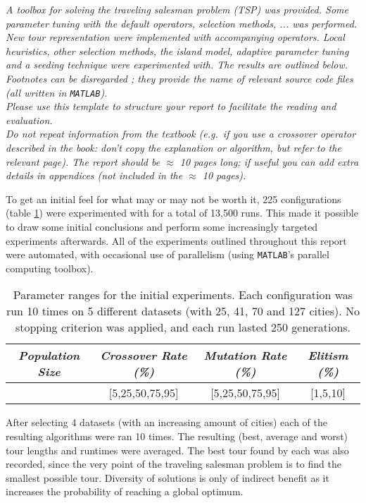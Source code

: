 
\begin{center}
\textit{A toolbox for solving the traveling salesman problem (TSP) was provided. Some parameter tuning with the default operators, selection methods, ... was performed. New tour representation were implemented with accompanying operators. Local heuristics, other selection methods, the island model, adaptive parameter tuning and a seeding technique were experimented with. The results are outlined below. Footnotes can be disregarded ; they provide the name of relevant source code files (all written in \texttt{MATLAB}).}\\
\textit{
Please use this template to structure your report to facilitate the reading and evaluation.\\
Do not repeat information from the textbook (e.g.\ if you use a crossover operator described in the book: don't copy the explanation or algorithm, but refer to the relevant page).
The report should be $\approx$ 10 pages long; if useful you can add extra details in appendices (not included in the $\approx$ 10 pages).
}
\end{center}


To get an initial feel for what may or may not be worth it, 225 configurations (table \ref{tab:par1}) were experimented with for a total of 13,500 runs. This made it possible to draw some initial conclusions and perform some increasingly targeted experiments afterwards. All of the experiments outlined throughout this report were automated, with occasional use of parallelism (using \texttt{MATLAB}'s parallel computing toolbox).

\begin{table}[h]
\centering
\begin{tabular}{c|c|c|c}
\textit{Population Size} & \textit{Crossover Rate (\%)} & \textit{Mutation Rate (\%)} & \textit{Elitism (\%)} \\\hline 
[150,300,1000] & [5,25,50,75,95] & [5,25,50,75,95] & [1,5,10]
\end{tabular}
\caption{Parameter ranges for the initial experiments. Each configuration was run 10 times on 5 different datasets (with 25, 41, 70 and 127 cities). No stopping criterion was applied, and each run lasted 250 generations.}
\label{tab:par1}
\end{table}

\noindent After selecting 4 datasets (with an increasing amount of cities) each of the resulting algorithms were ran 10 times. The resulting (best, average and worst) tour lengths and runtimes were averaged. The best tour found by each was also recorded, since the very point of the traveling salesman problem is to find the smallest possible tour. Diversity of solutions is only of indirect benefit as it increases the probability of reaching a global optimum.\\

